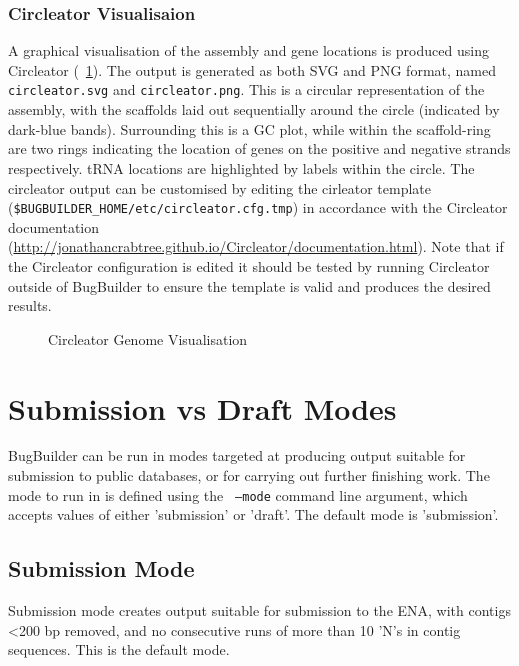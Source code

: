 \documentclass[a4paper,10pt]{article}
\begin{document}
\subsubsection{Circleator Visualisaion}

A graphical visualisation of the assembly and gene locations is produced using
Circleator (~\ref{fig:circleator}). The output is generated as both SVG and PNG format, named {\tt
circleator.svg} and {\tt circleator.png}. This is a circular representation of
the assembly, with the scaffolds laid out sequentially around the circle
(indicated by dark-blue bands). Surrounding this is a GC plot, while within
the scaffold-ring are two rings indicating the location of genes on the
positive and negative strands respectively. tRNA locations are highlighted by
labels within the circle. The circleator output can be customised by editing
the cirleator template ({\tt \$BUGBUILDER\_HOME\slash etc\slash circleator.cfg.tmp}) in accordance
with the Circleator documentation
(\href{http://jonathancrabtree.github.io/Circleator/documentation.html}{http://jonathancrabtree.github.io/Circleator/documentation.html}).
Note that if the Circleator configuration is edited it should be tested by
running Circleator outside of BugBuilder to ensure the template is valid and
produces the desired results.

\begin{figure}[ht] 
  \centering
  \caption{Circleator Genome Visualisation} 
  \label{fig:circleator} 
\end{figure}

\section{Submission vs Draft Modes}

BugBuilder can be run in modes targeted at producing output suitable for submission to public
databases, or for carrying out further finishing work. The mode to run in is defined using the {\tt
--mode} command line argument, which accepts values of either 'submission' or 'draft'. The
default mode is 'submission'.

\subsection{Submission Mode}

Submission mode creates output suitable for submission to the ENA, with contigs \textless200 bp removed,
and no consecutive runs of more than 10 'N's in contig sequences. This is the default mode. 
\end{document}
